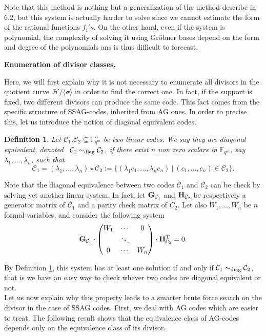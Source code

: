 \documentclass[10pt]{article}
\newtheorem{def1}[thm]{Definition}
\newcommand{\s}{\vspace{0.3cm}}
\newcommand{\cd}{\cdot}
\newcommand{\C}{\mathcal{C}}
\newcommand{\fqm}{\mathbb{F}_{q^m}}
\newcommand{\su}{\subseteq}
\begin{document}
Note that this method is nothing but a generalization of the method describe in 6.2, but this system is actually harder to solve since we cannot estimate the form of the rational functions $f_i's$. On the other hand, even if the system is polynomial, the complexity of solving it using Gröbner bases depend on the form and degree of the polynomials ans is thus difficult to forecast.

\newpage

\bf{Enumeration of divisor classes.} \rm

\s

Here, we will first explain why it is not necessary to enumerate all divisors in the quotient curve $\mathcal{H}/ \langle \sigma \rangle$ in order to find the correct one. In fact, if the support is fixed, two different divisors can produce the same code. This fact comes from the specific structure of SSAG-codes, inherited from AG ones. In order to precise this, let us introduce the notion of diagonal equivalent codes.

\s

\begin{def1} \label{diag}
Let $\C_1$,$\C_2 \su \fqm^n$ be two linear codes. We say they are diagonal equivalent, denoted \ $\C_1 \sim_{\rm diag} \C_2$, if there exist $n$ non zero scalars in $\fqm$, say $\lambda_1,...,\lambda_n$, such that 
\[\C_1 = (\lambda_1,...,\lambda_n) \star \C_2 := \{(\lambda_1c_1,...,\lambda_nc_n) \ | \ (c_1,...,c_n) \in \C_2\}.\]
\end{def1} 

Note that the diagonal equivalence between two codes $\C_1$ and $\C_2$ can be check by solving yet another linear system. In fact, let $\bf{G}_{\rm \C_1}$ and $\bf{H}_{\rm \C_2}$ be respectively a generator matrix of $\C_1$ and a parity check matrix of $C_2$. Let also $W_1,...,W_n$ be $n$ formal variables, and consider the following system
\begin{equation} \label{equiv}
\bf{G}_{\rm \C_1} \cd \begin{pmatrix}
W_1 & \cdots & 0 \\
\null & \ddots & \null \\
0 & \cdots & W_n
\end{pmatrix} \cd \bf{H}_{\rm \C_2}^{\rm T}\rm = 0.
\end{equation}

By Definition \ref{diag}, this system has at least one solution if and only if $\C_1 \sim_{\rm diag} \C_2$, that is we have an easy way to check whever two codes are diagonal equivalent or not. \\
Let us now explain why this property leads to a smarter brute force search on the divisor in the case of SSAG codes. First, we deal with AG codes which are easier to treat. The following result shows that the equivalence class of AG-codes depends only on the equivalence class of its divisor.
\end{document}

